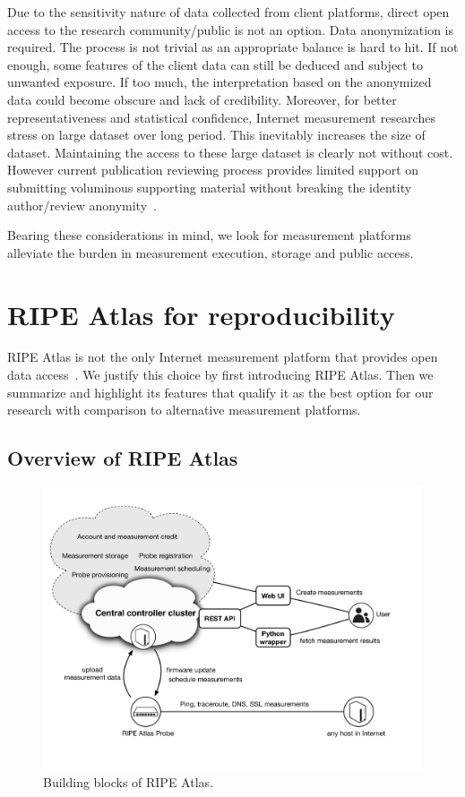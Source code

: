 Due to the sensitivity nature of data collected from client platforms, direct open access to the research community/public is not an option. Data anonymization is required. The process is not trivial as an appropriate balance is hard to hit. If not enough, some features of the client data can still be deduced and subject to unwanted exposure. If too much, the interpretation based on the anonymized data could become obscure and lack of credibility. Moreover, for better representativeness and statistical confidence, Internet measurement researches stress on large dataset over long period. This inevitably increases the size of dataset. Maintaining the access to these large dataset is clearly not without cost. However current publication reviewing process provides limited support on submitting voluminous supporting material without breaking the identity author/review anonymity~\cite{bajpai2017challenges}.

Bearing these considerations in mind, we look for measurement platforms alleviate the burden in measurement execution, storage and public access.

\section{RIPE Atlas for reproducibility}
RIPE Atlas is not the only Internet measurement platform that provides open data access~\cite{Bajpai2015}.
We justify this choice by first introducing RIPE Atlas. Then we summarize and highlight its features that qualify it as the best option for our research with comparison to alternative measurement platforms.

\subsection{Overview of RIPE Atlas}
\begin{figure}[!htb]
\centering
\includegraphics[width=\textwidth]{gfx/chap3/ripe_atlas_archi.pdf}
\caption{Building blocks of RIPE Atlas.}
\label{fig:ripe_atlas_archi}
\end{figure}

